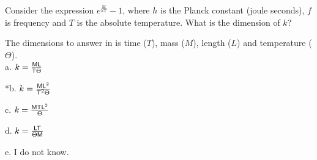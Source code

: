 
Consider the expression $e^{\frac{\text{hf}}{\text{kT}}} - 1$, where $h$ is the Planck constant (joule seconds), $f$ is frequency and $T$ is the absolute temperature. What is the dimension of $k$?

The dimensions to answer in is time ($T$), mass ($M$), length ($L$) and temperature ($\Theta$). \\

a. $k = \frac{\text{\textsf{ML}}}{\text{\textsf{T}}\Theta}$

*b. $k = \frac{\text{\textsf{ML}}^{2}}{\text{\textsf{T}}^{2}\Theta}$

c. $k = \frac{\text{\textsf{MTL}}^{2}}{\Theta}$

d. $k = \frac{\text{\textsf{LT}}}{\Theta \text{\textsf{M}}}$

e. I do not know.\\
